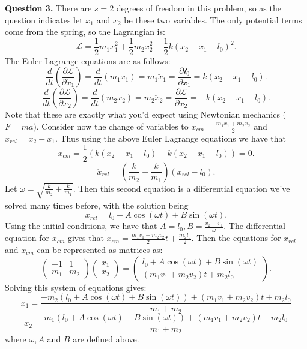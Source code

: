 \documentclass[letterpaper, reqno,11pt]{article}
\begin{document}
{\noindent\bf Question 3.} There are $s=2$ degrees of freedom in this problem, so as the question indicates let $x_1$ and $x_2$ be these two variables. The only potential terms come from the spring, so the Lagrangian is: 
\[
\mathcal L=\frac{1}{2}m_1 \dot x_1^2+\frac{1}{2}m_2\dot x_2^2-\frac{1}{2}k(x_2-x_1-l_0)^2
.\]
The Euler Lagrange equations are as follows: 
 \[
\frac{d}{dt}\left(\frac{\partial \mathcal L}{\partial \dot x_1}\right)=\frac{d}{dt}\left(m_1\dot x_1\right)=m_1\ddot x_1=\frac{\partial \mathcal l_0}{\partial x_1}=k(x_2-x_1-l_0)
.\]
 \[
\frac{d}{dt}\left(\frac{\partial \mathcal L}{\partial \dot x_2}\right)=\frac{d}{dt}\left(m_2\dot x_2\right)=m_2\ddot x_2=\frac{\partial \mathcal L}{\partial x_2}=-k(x_2-x_1-l_0)
.\]
Note that these are exactly what you'd expect using Newtonian mechanics ($F=ma$). Consider now the change of variables to $x_{cm}=\frac{m_1x_1+m_2x_2}{2}$ and $x_{rel}=x_2-x_1$. Thus using the above Euler Lagrange equations we have that 
\[
\ddot x_{cm}=\frac{1}{2}\left( k(x_2-x_1-l_0)-k(x_2-x_1-l_0) \right) =0
.\]
\[
\ddot x_{rel}=\left( \frac{k}{m_2}+\frac{k}{m_1} \right) \left( x_{rel}-l_0 \right)
.\]
Let $\omega =\sqrt{\frac{k}{m_2}+\frac{k}{m_1}} $. Then this second equation is a differential equation we've solved many times before, with the solution being
\[
x_{rel}=l_0+A\cos(\omega t)+B\sin(\omega t)
.\]
Using the initial conditions, we have that $A=l_0, B=\frac{v_2-v_1}{\omega}$. The differential equation for $x_{cm}$ gives that $x_{cm}=\frac{m_1v_1+m_2v_2}{2}t+\frac{m_2l_0}{2}$. Then the equations for $x_{rel}$ and $x_{cm}$ can be represented as matrices as: 
\[
    \begin{pmatrix} -1&1\\m_1&m_2 \end{pmatrix} \begin{pmatrix} x_1\\x_2 \end{pmatrix}=\begin{pmatrix} l_0+A\cos(\omega t)+B\sin(\omega t)\\(m_1v_1+m_2v_2)t+m_2l_0 \end{pmatrix}  
.\]
Solving this system of equations gives: 
\[
x_1=\frac{-m_2\left( l_0+A\cos(\omega t)+B\sin(\omega t) \right) +(m_1v_1+m_2v_2)t+m_2l_0}{m_1+m_2}
\]
\[
x_2=\frac{m_1\left( l_0+A\cos(\omega t)+B\sin(\omega t) \right) +(m_1v_1+m_2v_2)t+m_2l_0}{m_1+m_2}
\]
where $\omega, A$ and $B$ are defined above. 
\end{document}
